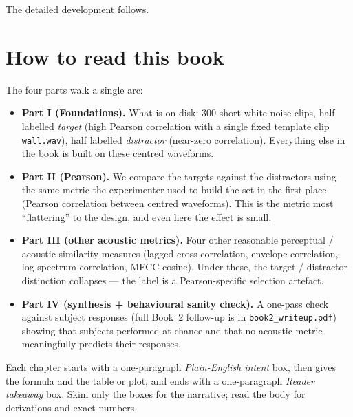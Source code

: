 \documentclass[11pt]{article}
\begin{document}
The detailed development follows.

\section*{How to read this book}

The four parts walk a single arc:

\begin{itemize}
\item \textbf{Part I (Foundations).} What is on disk: $300$ short white-noise
      clips, half labelled \emph{target} (high Pearson correlation with a
      single fixed template clip \texttt{wall.wav}), half labelled
      \emph{distractor} (near-zero correlation). Everything else in the book
      is built on these centred waveforms.

\item \textbf{Part II (Pearson).} We compare the targets against the
      distractors using the same metric the experimenter used to build the
      set in the first place (Pearson correlation between centred
      waveforms). This is the metric most ``flattering'' to the design,
      and even here the effect is small.

\item \textbf{Part III (other acoustic metrics).} Four other reasonable
      perceptual / acoustic similarity measures (lagged cross-correlation,
      envelope correlation, log-spectrum correlation, MFCC cosine). Under
      these, the target / distractor distinction collapses --- the label is a
      Pearson-specific selection artefact.

\item \textbf{Part IV (synthesis + behavioural sanity check).} A one-pass
      check against subject responses (full Book~2 follow-up is in
      \texttt{book2\_writeup.pdf}) showing that subjects performed at chance
      and that no acoustic metric meaningfully predicts their responses.
\end{itemize}

Each chapter starts with a one-paragraph \emph{Plain-English intent} box, then
gives the formula and the table or plot, and ends with a one-paragraph
\emph{Reader takeaway} box. Skim only the boxes for the narrative; read the
body for derivations and exact numbers.

\end{document}
